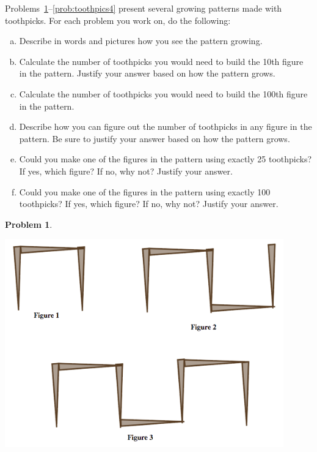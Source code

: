 \documentclass[12pt, reqno]{amsart}
\theoremstyle{remark}
\theoremstyle{definition}
\newtheorem{problem}{Problem}
\numberwithin{equation}{section}  %
\begin{document}
Problems~\ref{prob:toothpics1}--\ref{prob:toothpics4} present several growing patterns made with toothpicks.  For each problem you work on, do the following:
\begin{enumerate}[(a)]
\item
Describe in words and pictures how you see the pattern growing.\\

\item
Calculate the number of toothpicks you would need to build the 10th figure in the pattern.  Justify your answer based on how the pattern grows.\\

\item
Calculate the number of toothpicks you would need to build the 100th figure in the pattern.  \\

\item
Describe how you can figure out the number of toothpicks in any figure in the pattern.  Be sure to justify your answer based on how the pattern grows.\\

\item
Could you make one of the figures in the pattern using exactly 25 toothpicks?  If yes, which figure?  If no, why not?  Justify your answer.\\

\item
Could you make one of the figures in the pattern using exactly 100 toothpicks?  If yes, which figure?  If no, why not?    Justify your answer.\\


\end{enumerate}

\bigskip

\begin{problem}\label{prob:toothpics1}\ 

\begin{center}
\includegraphics[height=9cm]{toothpicks1}
\end{center}

\end{problem}
\end{document}
